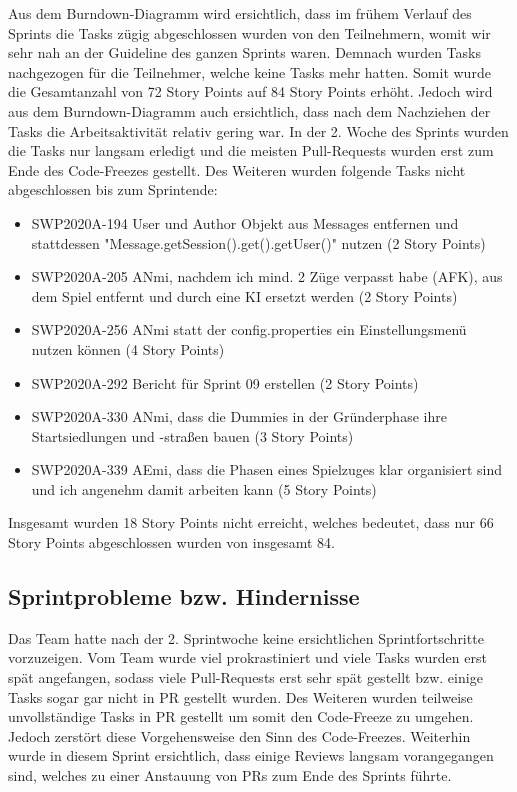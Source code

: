\documentclass[12pt,a4paper, oneside]{article}
\begin{document}
    \newpage
    \noindent
    Aus dem Burndown-Diagramm wird ersichtlich, dass im frühem Verlauf des Sprints die Tasks zügig abgeschlossen wurden von den Teilnehmern, womit wir sehr nah an der Guideline des ganzen Sprints waren. Demnach wurden Tasks nachgezogen für die Teilnehmer, welche keine Tasks mehr hatten.
    Somit wurde die Gesamtanzahl von 72 Story Points auf 84 Story Points erhöht.
    Jedoch wird aus dem Burndown-Diagramm auch ersichtlich, dass nach dem Nachziehen der Tasks die Arbeitsaktivität relativ gering war. In der 2. Woche des Sprints wurden die Tasks nur langsam erledigt und die meisten Pull-Requests wurden erst zum Ende des Code-Freezes gestellt. Des Weiteren wurden folgende Tasks nicht abgeschlossen bis zum Sprintende:

    \begin{itemize}

        \item SWP2020A-194 User und Author Objekt aus Messages entfernen und stattdessen "Message.getSession().get().getUser()" nutzen (2 Story Points)

        \item SWP2020A-205 ANmi, nachdem ich mind. 2 Züge verpasst habe (AFK), aus dem Spiel entfernt und durch eine KI ersetzt werden (2 Story Points)

        \item SWP2020A-256 ANmi statt der config.properties ein Einstellungsmenü nutzen können (4 Story Points)

        \item SWP2020A-292 Bericht für Sprint 09 erstellen (2 Story Points)

        \item SWP2020A-330 ANmi, dass die Dummies in der Gründerphase ihre Startsiedlungen und -straßen bauen (3 Story Points)

        \item SWP2020A-339 AEmi, dass die Phasen eines Spielzuges klar organisiert sind und ich angenehm damit arbeiten kann (5 Story Points)

    \end{itemize}

    \noindent
    Insgesamt wurden 18 Story Points nicht erreicht, welches bedeutet, dass nur 66 Story Points abgeschlossen wurden von insgesamt 84.

    \newpage

    \subsection{Sprintprobleme bzw. Hindernisse}
    Das Team hatte nach der 2. Sprintwoche keine ersichtlichen Sprintfortschritte vorzuzeigen. Vom Team wurde viel prokrastiniert und viele Tasks wurden erst spät angefangen, sodass viele Pull-Requests erst sehr spät gestellt bzw. einige Tasks sogar gar nicht in PR gestellt wurden. Des Weiteren wurden teilweise unvollständige Tasks in PR gestellt um somit den Code-Freeze zu umgehen. Jedoch zerstört diese Vorgehensweise den Sinn des Code-Freezes.
    Weiterhin wurde in diesem Sprint ersichtlich, dass einige Reviews langsam vorangegangen sind, welches zu einer Anstauung von PRs zum Ende des Sprints führte.
\end{document}
